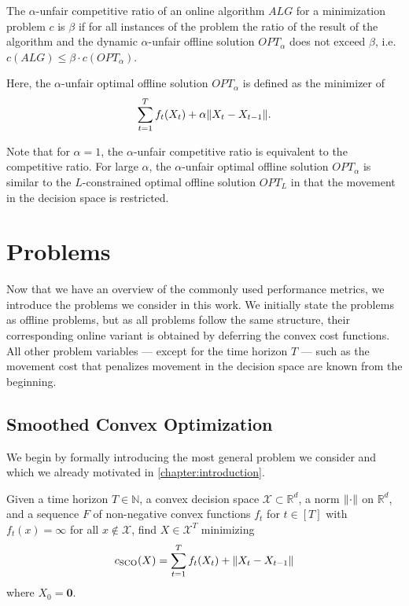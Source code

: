\begin{definition}
\cite{Andrew2015} The $\alpha$-unfair competitive ratio of an online algorithm $ALG$ for a minimization problem $c$ is $\beta$ if for all instances of the problem the ratio of the result of the algorithm and the dynamic $\alpha$-unfair offline solution $OPT_{\alpha}$ does not exceed $\beta$, i.e. $c(ALG) \leq \beta \cdot c(OPT_{\alpha})$.

Here, the $\alpha$-unfair optimal offline solution $OPT_{\alpha}$ is defined as the minimizer of \begin{align*}
    \sum_{t=1}^T f_t(X_t) + \alpha \lVert X_t - X_{t-1}\rVert.
\end{align*}
\end{definition}

Note that for $\alpha = 1$, the $\alpha$-unfair competitive ratio is equivalent to the competitive ratio. For large $\alpha$, the $\alpha$-unfair optimal offline solution $OPT_{\alpha}$ is similar to the $L$-constrained optimal offline solution $OPT_L$ in that the movement in the decision space is restricted.

\section{Problems}

Now that we have an overview of the commonly used performance metrics, we introduce the problems we consider in this work. We initially state the problems as offline problems, but as all problems follow the same structure, their corresponding online variant is obtained by deferring the convex cost functions. All other problem variables --- except for the time horizon $T$ --- such as the movement cost that penalizes movement in the decision space are known from the beginning.

\subsection{Smoothed Convex Optimization}

We begin by formally introducing the most general problem we consider and which we already motivated in \cref{chapter:introduction}.

\begin{problem}\label{problem:smoothed_convex_optimization}
Given a time horizon $T \in \mathbb{N}$, a convex decision space $\mathcal{X} \subset \mathbb{R}^d$, a norm $\lVert\cdot\rVert$ on $\mathbb{R}^d$, and a sequence $F$ of non-negative convex functions $f_t$ for $t \in [T]$ with $f_t(x) = \infty$ for all $x \not\in \mathcal{X}$, find $X \in \mathcal{X}^T$ minimizing \begin{align*}
    c_{\text{SCO}}(X) = \sum_{t=1}^T f_t(X_t) + \lVert X_t - X_{t-1}\rVert
\end{align*}
where $X_0 = \mathbf{0}$.
\end{problem}

